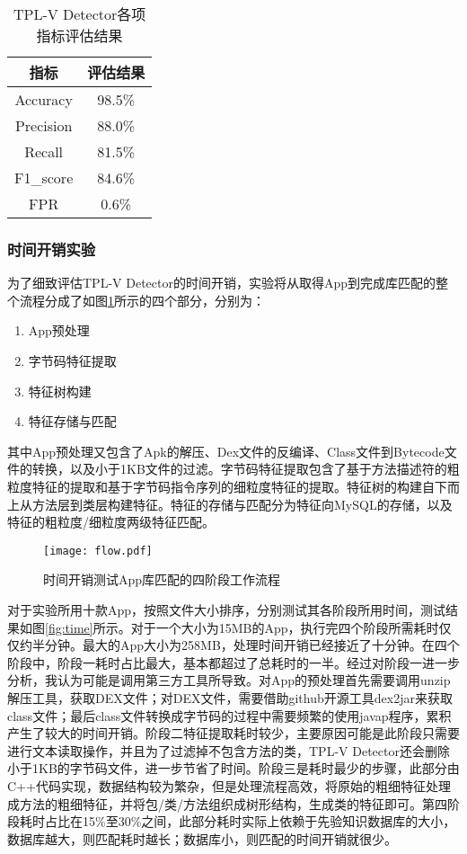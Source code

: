 \begin{table}[!hpt]
  \caption{TPL-V Detector各项指标评估结果}
  \label{tab:metric}
  \centering
  \begin{tabular}{cc} \toprule
    指标 &  评估结果 \\ \midrule
	Accuracy & 98.5\% \\
	Precision & 88.0\% \\
	Recall & 81.5\% \\
	F1\_score & 84.6\% \\
	FPR & 0.6\% \\
	 \bottomrule
  \end{tabular}
\end{table}


\subsubsection{时间开销实验}

为了细致评估TPL-V Detector的时间开销，实验将从取得App到完成库匹配的整个流程分成了如图\ref{fig:flow}所示的四个部分，分别为：
\begin{enumerate}
\item {App预处理}
\item {字节码特征提取}
\item {特征树构建}
\item {特征存储与匹配}
\end{enumerate}
其中App预处理又包含了Apk的解压、Dex文件的反编译、Class文件到Bytecode文件的转换，以及小于1KB文件的过滤。字节码特征提取包含了基于方法描述符的粗粒度特征的提取和基于字节码指令序列的细粒度特征的提取。特征树的构建自下而上从方法层到类层构建特征。特征的存储与匹配分为特征向MySQL的存储，以及特征的粗粒度/细粒度两级特征匹配。


\begin{figure}[!htp]
  \centering
  \texttt{[image: flow.pdf]} \\
  \caption{时间开销测试App库匹配的四阶段工作流程}
 \label{fig:flow}
\end{figure}

对于实验所用十款App，按照文件大小排序，分别测试其各阶段所用时间，测试结果如图\ref{fig:time}所示。对于一个大小为15MB的App，执行完四个阶段所需耗时仅仅约半分钟。最大的App大小为258MB，处理时间开销已经接近了十分钟。在四个阶段中，阶段一耗时占比最大，基本都超过了总耗时的一半。经过对阶段一进一步分析，我认为可能是调用第三方工具所导致。对App的预处理首先需要调用unzip解压工具，获取DEX文件；对DEX文件，需要借助github开源工具dex2jar来获取class文件；最后class文件转换成字节码的过程中需要频繁的使用javap程序，累积产生了较大的时间开销。阶段二特征提取耗时较少，主要原因可能是此阶段只需要进行文本读取操作，并且为了过滤掉不包含方法的类，TPL-V Detector还会删除小于1KB的字节码文件，进一步节省了时间。阶段三是耗时最少的步骤，此部分由C++代码实现，数据结构较为繁杂，但是处理流程高效，将原始的粗细特征处理成方法的粗细特征，并将包/类/方法组织成树形结构，生成类的特征即可。第四阶段耗时占比在15\%至30\%之间，此部分耗时实际上依赖于先验知识数据库的大小，数据库越大，则匹配耗时越长；数据库小，则匹配的时间开销就很少。




